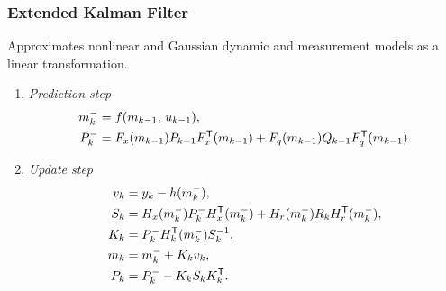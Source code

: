 \documentclass[aspectratio=43]{beamer}
\begin{document}
\begin{frame}
  \frametitle{Extended Kalman Filter}
  Approximates \alert{nonlinear} and \alert{Gaussian} dynamic and measurement models as a linear transformation.
  \vspace{0.4em}
  \begin{block}{}
    \begin{enumerate}
    \item \textit{Prediction step} 
    \begin{equation} \label{eq:Predict}
        \begin{aligned}
            m_{k}^- &= f(m_{k-1},\,u_{k-1}), \\
            P_{k}^- &= F_x(m_{k-1})P_{k-1}F_x^{\sf T}(m_{k-1}) + F_q(m_{k-1})Q_{k-1}F_q^{\sf T}(m_{k-1}). \notag
        \end{aligned}
    \end{equation}
    \item \textit{Update step} 
    \begin{equation} \label{eq:Update}
        \begin{aligned}
            v_{k} &= y_{k} - h(m_k^-), \\
            S_{k} &= H_x(m_k^-)P_{k}^-H_x^{\sf T}(m_k^-) + H_r(m_k^-)R_kH_r^{\sf T}(m_k^-), \\
            K_k &= P_k^-H_k^{\sf T}(m_k^-)S_k^{-1}, \\
            m_k &= m_k^- + K_kv_k, \\
            P_k &= P_k^- - K_kS_kK_k^{\sf T}.
        \end{aligned} \notag
    \end{equation}
    \end{enumerate} 
  \end{block}
\end{frame}
\end{document}
